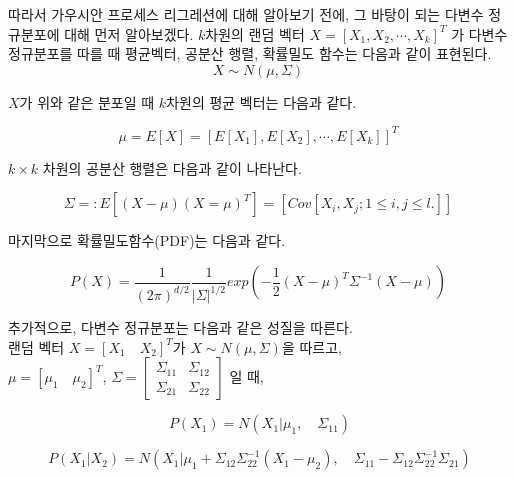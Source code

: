 \documentclass[a4paper]{oblivoir}
\begin{document}
따라서 가우시안 프로세스 리그레션에 대해 알아보기 전에, 그 바탕이 되는 다변수 정규분포에 대해 먼저 알아보겠다. $k$차원의 랜덤 벡터 $X =[X_{1}, X_{2}, \cdots , X_{k}]^{T}$ 가 다변수 정규분포를 따를 때 평균벡터, 공분산 행렬, 확률밀도 함수는 다음과 같이 표현된다.\\

\begin{equation}
X  \sim  N(\mu,\Sigma) \
\label{eq:12-8}
\end{equation} 

$X$가 위와 같은 분포일 때 $k$차원의 평균 벡터는 다음과 같다.

\begin{equation}
\mu = E[X] = \left[E[X_{1}], E[X_{2}], \cdots , E[X_{k}]\right]^{T}\
\label{eq:12-9}
\end{equation} 

$k\times k$ 차원의 공분산 행렬은 다음과 같이 나타난다.

\begin{equation}
\Sigma =: E \left[(X -\mu)(X=\mu)^{T} \right] = \left[Cov[X_{i},X_{j};1 \leq i,j \leq l.]  \right]\
\label{eq:12-10}
\end{equation} 

마지막으로 확률밀도함수(PDF)는 다음과 같다.

\begin{equation}
P(X) = \frac{1}{(2 \pi) ^{d/2}} \frac{1}{|\Sigma|^{1/2}}exp\left(-\frac{1}{2}(X -\mu)^{T} \Sigma^{-1}(X- \mu)\right)\
\label{eq:12-11}
\end{equation} 

추가적으로, 다변수 정규분포는 다음과 같은 성질을 따른다.\\

랜덤 벡터  $X = [X_{1} \quad X_{2}]^{T}$가 $X \sim N(\mu , \Sigma )$을 따르고,\\

$\mu =[\mu_1 \quad \mu_2]^{T}$, $\Sigma = \begin{bmatrix} \Sigma_{11} &\Sigma_{12}\\ \Sigma_{21} & \Sigma_{22} \end{bmatrix}$ 일 때,

\begin{equation}
P(X_{1}) = N(X_{1}|\mu_{1}, \quad \Sigma_{11})
\label{eq:12-12}
\end{equation} 

\begin{equation}
P(X_{1}|X_{2}) = N(X_{1}|\mu_{1} + \Sigma_{12}\Sigma_{22}^{-1}(X_{1}-\mu_{2}), \quad \Sigma_{11} - \Sigma_{12}\Sigma_{22}^{-1}\Sigma_{21})
\label{eq:12-13}
\end{equation} 
\end{document}
